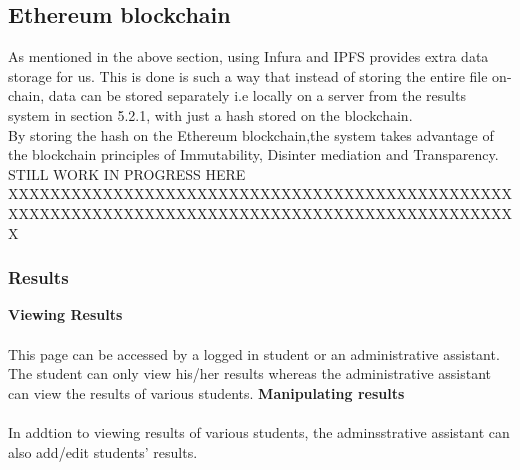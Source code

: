 \subsection{Ethereum blockchain}
As mentioned in the above section, using Infura and IPFS provides extra data storage for us. This is done is such a way that instead of storing the entire file on-chain, data can be stored separately i.e locally on a server from the results system in section 5.2.1, with just a hash stored on the blockchain.\\By storing the hash on the Ethereum blockchain,the system takes advantage of the blockchain principles of Immutability, Disinter mediation and Transparency.
STILL WORK IN PROGRESS HERE
XXXXXXXXXXXXXXXXXXXXXXXXXXXXXXXXXXXXXXXXXXXXXXXXXXXXXXXXXXXXXXXXXXXXXXXXXXXXXXXXXXXXXXXXXXXXXXXXX


\subsubsection{Results}
\textbf{Viewing Results}\\~\\
This page can be accessed by a logged in student or an administrative assistant. The student can only view his/her results whereas the administrative assistant can view the results of various students.
\textbf{Manipulating results}\\~\\
In addtion to viewing results of various students, the adminsstrative assistant can also add/edit students’ results.
